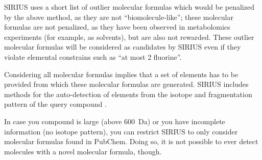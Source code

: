 \documentclass[letterpaper,10pt,openany,oneside]{sphinxmanual}
\newcommand{\todo}[1]{}
\begin{document}
%

SIRIUS uses a short list of outlier molecular formulas which would be
penalized by the above method, as they are not ``biomolecule-like''; these
molecular formulas are not penalized, as they have been observed in
metabolomics experiments (for example, as solvents), but are also not
rewarded. These outlier molecular formulas
will be considered as candidates by SIRIUS even if they violate elemental
constrains such as ``at most 2 fluorine''.  

Considering all molecular formulas implies that a set of elements has to be
provided from which these molecular formulas are generated.  SIRIUS
includes methods for the auto-detection of elements from the isotope and
fragmentation pattern of the query compound \citep{meusel16predicting}.

In case you compound is large (above 600~Da) or you have incomplete
information (no isotope pattern), you can restrict SIRIUS to only consider
molecular formulas found in PubChem.  Doing so, it is not possible to ever
detect molecules with a novel molecular formula, though.
\end{document}

